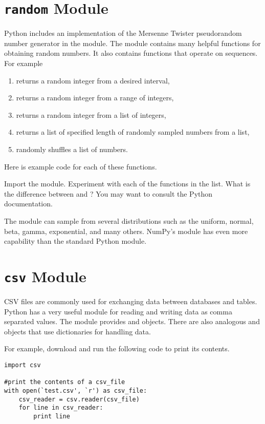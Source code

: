 \section*{\texttt{random} Module}
Python includes an implementation of the Mersenne Twister pseudorandom number generator in the  module.
The  module contains many helpful functions for obtaining random numbers.
It also contains functions that operate on sequences.  For example
\begin{enumerate}
\item {} returns a random integer from a desired interval,
\item {} returns a random integer from a  range of integers,
\item {} returns a random integer from a list of integers,
\item {} returns a list of specified length of randomly sampled numbers from a list,
\item {} randomly shuffles a list of numbers.
\end{enumerate}

Here is example code for each of these functions.
\begin{problem}
Import the  module.  Experiment with each of the functions in the list.  What is the difference between  and ?  You may want to consult the Python documentation.
\end{problem}

The  module can sample from several distributions such as the uniform, normal, beta, gamma, exponential, and many others.
NumPy's  module has even more capability than the standard Python  module.

\section*{\texttt{csv} Module}
CSV files are commonly used for exchanging data between databases and tables. 
Python has a very useful module for reading and writing data as comma separated values.
The  module provides  and  objects.
There are also analogous  and  objects that use dictionaries for handling data.

For example, download  and run the following code to print its contents.
\begin{lstlisting}
import csv

#print the contents of a csv_file
with open(`test.csv', `r') as csv_file:
    csv_reader = csv.reader(csv_file)
    for line in csv_reader:
        print line
\end{lstlisting}

